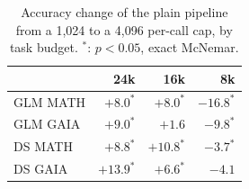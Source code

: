 \begin{table}[h]
\centering
\small
\begin{tabular}{@{}lrrr@{}}
\toprule
& 24k & 16k & 8k \\
\midrule
GLM MATH & $+8.0^{*}$ & $+8.0^{*}$ & $-16.8^{*}$ \\
GLM GAIA & $+9.0^{*}$ & $+1.6$ & $-9.8^{*}$ \\
DS MATH & $+8.8^{*}$ & $+10.8^{*}$ & $-3.7^{*}$ \\
DS GAIA & $+13.9^{*}$ & $+6.6^{*}$ & $-4.1$ \\
\bottomrule
\end{tabular}
\caption{Accuracy change of the plain pipeline from a 1{,}024 to a 4{,}096 per-call cap, by task
budget. $^{*}$: $p < 0.05$, exact McNemar.}
\label{tab:caps}
\end{table}
